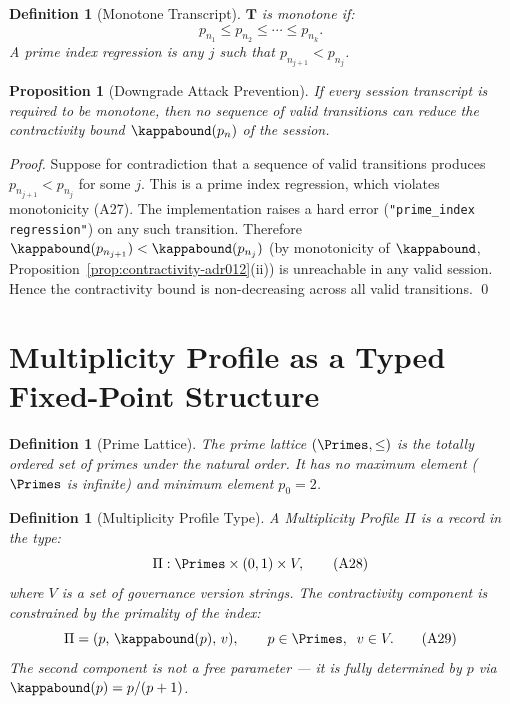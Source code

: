 \documentclass[11pt,letterpaper]{article}
\newtheorem{proposition}[theorem]{Proposition}
\newtheorem{definition}[theorem]{Definition}
\theoremstyle{remark}
\begin{document}
\begin{definition}[Monotone Transcript]
$\mathbf{T}$ is \emph{monotone} if:
\[
  p_{n_1} \leq p_{n_2} \leq \cdots \leq p_{n_k}. \tag{A27}
\]
A \emph{prime index regression} is any $j$ such that $p_{n_{j+1}} < p_{n_j}$.
\end{definition}

\begin{proposition}[Downgrade Attack Prevention]
\label{prop:downgrade}
If every session transcript is required to be monotone, then no sequence
of valid transitions can reduce the contractivity bound $\kappabound(p_n)$
of the session.
\end{proposition}

\begin{proof}
Suppose for contradiction that a sequence of valid transitions produces
$p_{n_{j+1}} < p_{n_j}$ for some $j$.  This is a prime index regression,
which violates monotonicity (A27).  The implementation raises a hard error
(\texttt{"prime\_index regression"}) on any such transition.  Therefore
$\kappabound(p_{n_{j+1}}) < \kappabound(p_{n_j})$ (by monotonicity of
$\kappabound$, Proposition~\ref{prop:contractivity-adr012}(ii)) is
unreachable in any valid session.  Hence the contractivity bound is
non-decreasing across all valid transitions. \qed
\end{proof}

\section{Multiplicity Profile as a Typed Fixed-Point Structure}
\label{sec:profile-fixedpoint}

\begin{definition}[Prime Lattice]
\label{def:prime-lattice}
The \emph{prime lattice} $(\Primes, \leq)$ is the totally ordered set of
primes under the natural order.  It has no maximum element
($\Primes$ is infinite) and minimum element $p_0 = 2$.
\end{definition}

\begin{definition}[Multiplicity Profile Type]
\label{def:profile-type}
A \emph{Multiplicity Profile} $\Pi$ is a record in the type:
\[
  \Pi : \Primes \times (0,1) \times V, \tag{A28}
\]
where $V$ is a set of governance version strings.  The contractivity
component is constrained by the primality of the index:
\[
  \Pi = (p,\, \kappabound(p),\, v), \qquad p \in \Primes, \;\; v \in V. \tag{A29}
\]
The second component is \emph{not a free parameter} — it is fully
determined by $p$ via $\kappabound(p) = p/(p+1)$.
\end{definition}
\end{document}
